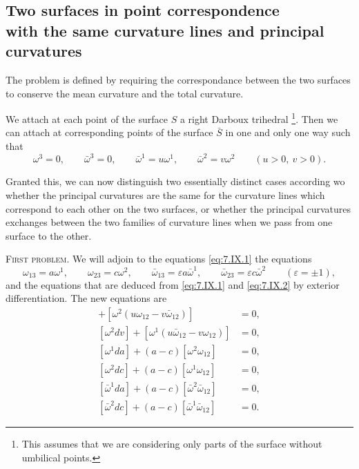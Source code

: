 \documentclass[leqno,11pt]{book}
\numberwithin{equation}{chapter}
\theoremstyle{shape1}
\theoremstyle{shape0}
\theoremstyle{shape2}
\theoremstyle{definition}
\begin{document}
\subsection[{Two surfaces in point correspondence with the same curvature lines and principal curvatures}]{Two surfaces in point correspondence\\with the same curvature lines and principal curvatures}
\label{sec:some-surfaces-point}

\fsec The problem is defined by requiring the correspondance between the two surfaces to conserve the mean curvature and the total curvature.

We attach at each point of the surface $S$ a right Darboux trihedral \footnote{This assumes that we are considering only parts of the surface without umbilical points.}. Then we can attach at corresponding points of the surface $\bar S$ in one and only one way such that
\begin{equation}
  \label{eq:7.IX.1}\tag{IX, 1}
  \omega^{3}=0,\qquad\bar\omega^{3}=0,\qquad\bar\omega^{1}=u\omega^{1},\qquad\bar\omega^{2}=v\omega^{2}\qquad(u>0,\ v>0).
\end{equation}

Granted this, we can now distinguish two essentially distinct cases according wo whether the principal curvatures are the same for the curvature lines which correspond to each other on the two surfaces, or whether the principal curvatures exchanges between the two families of curvature lines when we pass from one surface to the other.


\vspace{12pt}\fsec\textsc{First problem}. We will adjoin to the equations \eqref{eq:7.IX.1} the equations
\begin{equation}
  \label{eq:7.IX.2}\tag{IX, 2}
  \omega_{13}=a\omega^{1},\qquad\omega_{23}=c\omega^{2},\qquad\bar\omega_{13}=\varepsilon a\bar\omega^{1},\qquad\bar\omega_{23}=\varepsilon c\bar\omega^{2}\qquad(\varepsilon=\pm1),
\end{equation}
and the equations that are deduced from \eqref{eq:7.IX.1} and \eqref{eq:7.IX.2} by exterior differentiation. The new equations are
\begin{align*}
  [\omega^{1}du]+[\omega^{2}(u\omega_{12}-v\bar\omega_{12})]&=0,\\
  [\omega^{2}dv]+[\omega^{1}(u\bar\omega_{12}-v\omega_{12})]&=0,\\
  [\omega^{1}da]+(a-c)[\omega^{2}\omega_{12}]&=0,\\
  [\omega^{2}dc]+(a-c)[\omega^{1}\omega_{12}]&=0,\\
  [\bar\omega^{1}da]+(a-c)[\bar\omega^{2}\bar\omega_{12}]&=0,\\
  [\bar\omega^{2}dc]+(a-c)[\bar\omega^{1}\bar\omega_{12}]&=0.
\end{align*}
\end{document}
